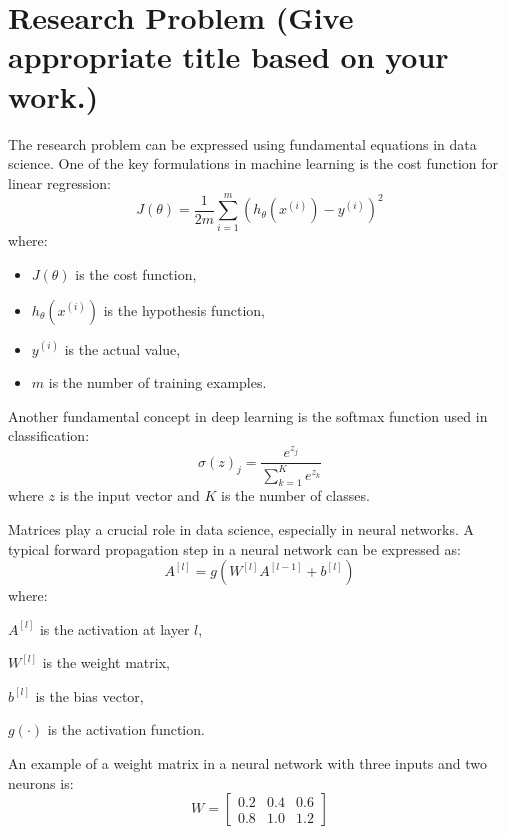 
\chapter{Research Problem (Give appropriate title based on your work.)}
The research problem can be expressed using fundamental equations in data science. One of the key formulations in machine learning is the cost function for linear regression:
\begin{equation}
	J(\theta) = \frac{1}{2m} \sum_{i=1}^{m} \left( h_\theta (x^{(i)}) - y^{(i)} \right)^2
\end{equation}
where:
\begin{itemize}
	\item $J(\theta)$ is the cost function,
	\item $h_\theta(x^{(i)})$ is the hypothesis function,
	\item $y^{(i)}$ is the actual value,
	\item $m$ is the number of training examples.
\end{itemize}

Another fundamental concept in deep learning is the softmax function used in classification:
\begin{equation}
	\sigma(z)_j = \frac{e^{z_j}}{\sum_{k=1}^{K} e^{z_k}}
\end{equation}
where $z$ is the input vector and $K$ is the number of classes.

Matrices play a crucial role in data science, especially in neural networks. A typical forward propagation step in a neural network can be expressed as:
\begin{equation}
	A^{[l]} = g(W^{[l]} A^{[l-1]} + b^{[l]})
\end{equation}
where:
\begin{description}
	\item $A^{[l]}$ is the activation at layer $l$,
	\item $W^{[l]}$ is the weight matrix,
	\item $b^{[l]}$ is the bias vector,
	\item $g(\cdot)$ is the activation function.
\end{description}

An example of a weight matrix in a neural network with three inputs and two neurons is:
\begin{equation}
	W = \begin{bmatrix} 0.2 & 0.4 & 0.6 \\ 0.8 & 1.0 & 1.2 \end{bmatrix}
\end{equation}

